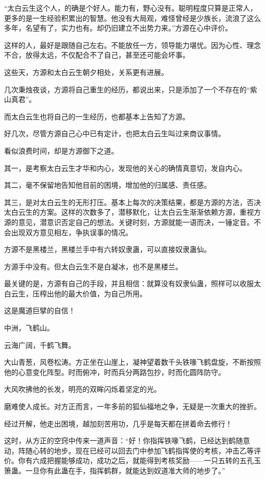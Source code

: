 \begin{this_body}
“太白云生这个人，的确是个好人。能力有，野心没有。聪明程度只算是正常人，更多的是一生经验积累出的智慧。他没有大局观，难怪曾经是少族长，流浪了这么多年，名望有了，实力也有。却仍旧建立不出势力来。”方源在心中评价。

这样的人，最好是跟随自己左右。不能放任一方，领导能力堪忧。因为心性、理念不合，放得太远，不仅配合不了自己，甚至还可能会坏事。

这些天，方源和太白云生朝夕相处，关系更有进展。

几次秉烛夜谈，方源将自己重生的经历，都说出来，只是添加了一个不存在的“紫山真君”。

而太白云生也将自己的一生经历，也都基本上告知了方源。

好几次，尽管方源自己心中已有定计，也把太白云生叫过来商议事情。

看似浪费时间，却是方源御下之道。

其一，是考察太白云生才华和内心，发现他的关心的确情真意切，发自内心。

其二，毫不保留地告知他目前的困境，增加他的归属感、责任感。

其三，是对太白云生的无形打压。基本上每次的决策结果，都是方源的方法，否决太白云生的方案。这样的次数多了，潜移默化，让太白云生渐渐依赖方源，重视方源的意见，潜意识否定自己的想法。关键时刻，方源就能一语而决，一锤定音。不会出现双方意见相左，争执误事的情况。

方源不是黑楼兰，黑楼兰手中有六转奴隶蛊，可以直接奴隶蛊仙。

方源手中没有。但太白云生不是白凝冰，也不是黑楼兰。

最关键的是，方源有自己的手段，并且相信：就算没有奴隶仙蛊，照样可以收服太白云生，压榨出他的最大价值，为自己所用。

这是魔道巨擘的自信！

中洲，飞鹤山。

云海广阔，千鹤飞舞。

大山青葱，风卷松涛。方正坐在山崖上，凝神望着数千头铁喙飞鹤盘旋，不断按照他的心意变化阵型。时而俯冲，时而兵分两路包抄，时而化圆阵防守。

大风吹拂他的长发，明亮的双眸闪烁着坚定的光。

磨难使人成长。对方正而言，一年多前的狐仙福地之争，无疑是一次重大的挫折。

经过开解，他走出困境，越加刻苦用功，几乎是每天都在拼着命去修行！

这时，从方正的空窍中传来一道声音：“好！你指挥铁喙飞鹤，已经达到鹤随意动，阵随心转的地步。现在已经可以回去门中参加飞鹤指挥使的考核，冲击乙等评价。你有六成把握能够成功，成功之后，就能得到考核奖励——一只五转的五孔玉箫蛊。一旦你有此蛊在手，指挥鹤群，就能达到奴道准大师的地步了。”


\end{this_body}
